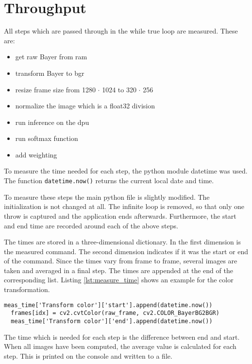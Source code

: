 \section{Throughput}
\label{sec:verification_and_benchmark:throughput}

All steps which are passed through in the while true loop are measured. 
These are:
\begin{itemize}
	\item get raw Bayer from \acrshort{ram}
	\item transform Bayer to \acrshort{bgr} 
	\item resize frame size from 1280 $\cdot$ 1024 to 320 $\cdot$ 256
	\item normalize the image which is a float32 division
	\item run inference on the \acrshort{dpu}
	\item run softmax function
	\item add weighting
\end{itemize}

To measure the time needed for each step, the python module datetime was used.
The function \texttt{datetime.now()} returns the current local date and time.

To measure these steps the main python file is slightly modified.
The initialization is not changed at all.
The infinite loop is removed, so that only one throw is captured and the application ends afterwards.
Furthermore, the start and end time are recorded around each of the above steps.

The times are stored in a three-dimensional dictionary.
In the first dimension is the measured command.
The second dimension indicates if it was the start or end of the command.
Since the times vary from frame to frame, several images are taken and averaged in a final step.
The times are appended at the end of the corresponding list.
Listing \ref{lst:measure_time} shows an example for the color transformation.

\begin{lstlisting}[style=python, caption={Measure needed time for the color transformation}, label=lst:measure_time]
  meas_time['Transform color']['start'].append(datetime.now())
  frames[idx] = cv2.cvtColor(raw_frame, cv2.COLOR_BayerBG2BGR)
  meas_time['Transform color']['end'].append(datetime.now())
\end{lstlisting}

The time which is needed for each step is the difference between end and start.
When all images have been computed, the average value is calculated for each step.
This is printed on the console and written to a file.

